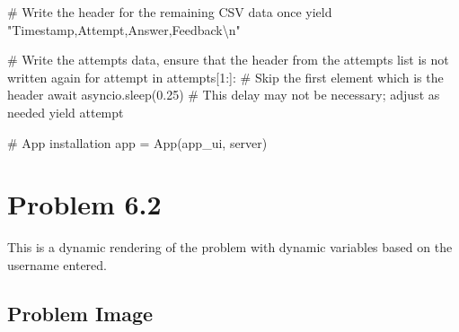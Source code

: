 \documentclass[
  letterpaper,
  DIV=11,
  numbers=noendperiod]{scrreprt}
\newenvironment{Shaded}{\begin{snugshade}}{\end{snugshade}}
\newcommand{\NormalTok}[1]{\textcolor[rgb]{0.00,0.23,0.31}{#1}}
\begin{document}
\begin{Shaded}
\begin{Highlighting}[]
\NormalTok{        \# Write the header for the remaining CSV data once}
\NormalTok{        yield "Timestamp,Attempt,Answer,Feedback\textbackslash{}n"}
        
\NormalTok{        \# Write the attempts data, ensure that the header from the attempts list is not written again}
\NormalTok{        for attempt in attempts[1:]:  \# Skip the first element which is the header}
\NormalTok{            await asyncio.sleep(0.25)  \# This delay may not be necessary; adjust as needed}
\NormalTok{            yield attempt}


\NormalTok{\# App installation}
\NormalTok{app = App(app\_ui, server)}
\end{Highlighting}
\end{Shaded}

\chapter*{Problem 6.2}\label{problem-6.2}


This is a dynamic rendering of the problem with dynamic variables based
on the username entered.

\section*{Problem Image}\label{problem-image-60}

\end{document}
